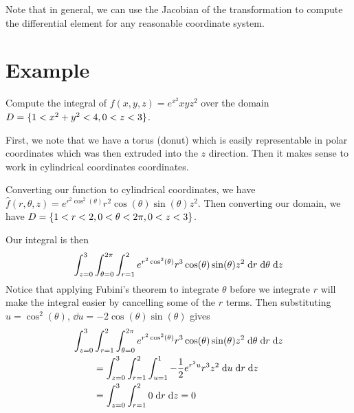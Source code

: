 \documentclass[letterpaper,11pt]{article}
\begin{document}
Note that in general, we can use the Jacobian of the transformation to compute the differential element for any reasonable coordinate system.
\section*{Example}
Compute the integral of $f(x, y, z) = e^{x^2} x y z^2$ over the domain $D = \{ 1 < x^2 + y^2 < 4, 0 < z < 3 \}$.

First, we note that we have a torus (donut) which is easily representable in polar coordinates which was then extruded into the $z$ direction.
Then it makes sense to work in cylindrical coordinates coordinates.

Converting our function to cylindrical coordinates, we have $\hat{f}(r, \theta, z) = e^{r^2 \cos^2(\theta)} r^2 \cos(\theta) \sin(\theta) z^2$.
Then converting our domain, we have $D = \{ 1 < r < 2, 0 < \theta < 2 \pi, 0 < z < 3 \}$.

Our integral is then
\begin{equation*}
  \int_{z = 0}^{3} \int_{\theta = 0}^{2 \pi} \int_{r = 1}^{2} e^{r^2 \cos^2(\theta)} r^3 \cos(\theta) \sin(\theta) z^2 \;\mathrm{d}r \;\mathrm{d}\theta \;\mathrm{d}z
\end{equation*}
Notice that applying Fubini's theorem to integrate $\theta$ before we integrate $r$ will make the integral easier by cancelling some of the $r$ terms.
Then substituting $u = \cos^2(\theta)$, $\dd{u} = -2 \cos(\theta) \sin(\theta)$ gives
\begin{align*}
  \int_{z = 0}^{3} & \int_{r = 1}^{2} \int_{\theta = 0}^{2 \pi} e^{r^2 \cos^2(\theta)} r^3 \cos(\theta) \sin(\theta) z^2 \;\mathrm{d}\theta \;\mathrm{d}r \;\mathrm{d}z\\
  & = \int_{z = 0}^{3} \int_{r = 1}^{2} \int_{u = 1}^{1} -\frac{1}{2} e^{r^2 u} r^3 z^2 \;\mathrm{d}u \;\mathrm{d}r \;\mathrm{d}z\\
  & = \int_{z = 0}^{3} \int_{r = 1}^{2} 0 \;\mathrm{d}r \;\mathrm{d}z = 0
\end{align*}
\end{document}
